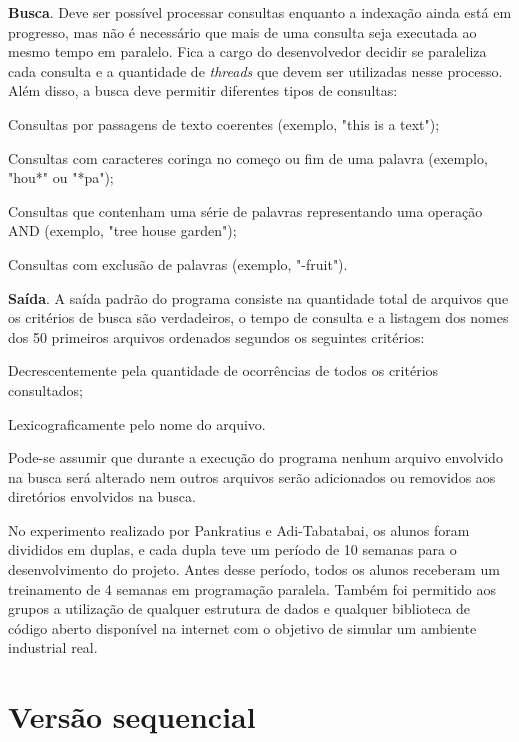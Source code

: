 \textbf{Busca}. Deve ser possível processar consultas enquanto a indexação ainda está em progresso, mas não é necessário que mais de uma consulta seja executada ao mesmo tempo em paralelo. Fica a cargo do desenvolvedor decidir se paraleliza cada consulta e a quantidade de \emph{threads} que devem ser utilizadas nesse processo. Além disso, a busca deve permitir diferentes tipos de consultas:
\begin{compactenum}
  \item Consultas por passagens de texto coerentes (exemplo, "this is a text");
  \item Consultas com caracteres coringa no começo ou fim de uma palavra (exemplo, "hou*" ou "*pa");
  \item Consultas que contenham uma série de palavras representando uma operação AND (exemplo, "tree house garden");
  \item Consultas com exclusão de palavras (exemplo, "-fruit").
\end{compactenum}

\textbf{Saída}. A saída padrão do programa consiste na quantidade total de arquivos que os critérios de busca são verdadeiros, o tempo de consulta e a listagem dos nomes dos 50 primeiros arquivos ordenados segundos os seguintes critérios:
\begin{compactenum}
  \item Decrescentemente pela quantidade de ocorrências de todos os critérios consultados;
  \item Lexicograficamente pelo nome do arquivo.
\end{compactenum}

Pode-se assumir que durante a execução do programa nenhum arquivo envolvido na busca será alterado nem outros arquivos serão adicionados ou removidos aos diretórios envolvidos na busca.

No experimento realizado por Pankratius e Adi-Tabatabai, os alunos foram divididos em duplas, e cada dupla teve um período de 10 semanas para o desenvolvimento do projeto. Antes desse período, todos os alunos receberam um treinamento de 4 semanas em programação paralela. Também foi permitido aos grupos a utilização de qualquer estrutura de dados e qualquer biblioteca de código aberto disponível na internet com o objetivo de simular um ambiente industrial real.


\section{Versão sequencial}

